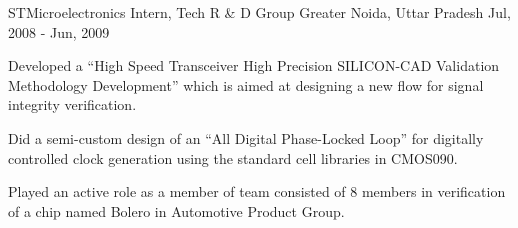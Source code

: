 \begin{cventries}
  \cventry
    {STMicroelectronics} %
    {Intern, Tech R \& D Group} %
    {Greater Noida, Uttar Pradesh} %
    {Jul, 2008 - Jun, 2009} %
    {
      \begin{cvitems} %
        \item {Developed a “High Speed Transceiver High Precision SILICON-CAD Validation Methodology Development” which is aimed at designing a new flow for signal integrity verification.}
        \item {Did a semi-custom design of an “All Digital Phase-Locked Loop” for digitally controlled clock generation using the standard cell libraries in CMOS090.}
        \item {Played an active role as a member of team consisted of 8 members in verification of a chip named Bolero in Automotive Product Group.}
      \end{cvitems}
    }

\end{cventries}
